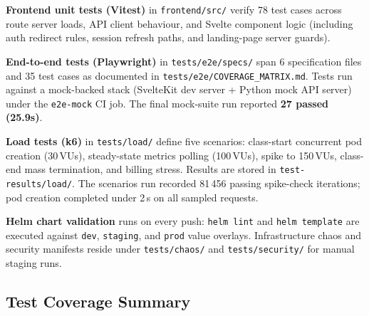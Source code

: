 \documentclass[12pt,a4paper]{article}
\begin{document}
\textbf{Frontend unit tests (Vitest)} in \texttt{frontend/src/} verify 78 test
cases across route server loads, API client behaviour, and Svelte component
logic (including auth redirect rules, session refresh paths, and landing-page
server guards).

\textbf{End-to-end tests (Playwright)} in \texttt{tests/e2e/specs/} span
6 specification files and 35 test cases as documented in
\texttt{tests/e2e/COVERAGE\_MATRIX.md}. Tests run against a mock-backed stack
(SvelteKit dev server + Python mock API server) under the \texttt{e2e-mock} CI
job. The final mock-suite run reported \textbf{27 passed (25.9s)}.

\textbf{Load tests (k6)} in \texttt{tests/load/} define five scenarios:
class-start concurrent pod creation (30\,VUs), steady-state metrics polling
(100\,VUs), spike to 150\,VUs, class-end mass termination, and billing stress.
Results are stored in \texttt{test-results/load/}. The scenarios run recorded
81\,456 passing spike-check iterations; pod creation completed under 2\,s on
all sampled requests.

\textbf{Helm chart validation} runs on every push: \texttt{helm lint} and
\texttt{helm template} are executed against \texttt{dev}, \texttt{staging},
and \texttt{prod} value overlays. Infrastructure chaos and security manifests
reside under \texttt{tests/chaos/} and \texttt{tests/security/} for manual
staging runs.

\subsection{Test Coverage Summary}
\end{document}
